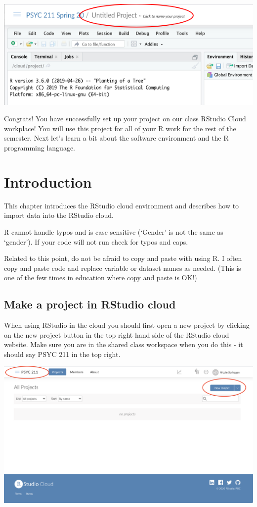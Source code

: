 \documentclass[
]{book}
\begin{document}
\includegraphics{img/Projname.png}

Congrats! You have successfully set up your project on our class RStudio Cloud workplace! You will use this project for all of your R work for the rest of the semester. Next let's learn a bit about the software environment and the R programming language.

\hypertarget{introduction}{%
\chapter{Introduction}\label{introduction}}

This chapter introduces the RStudio cloud environment and describes how to import data into the RStudio cloud.

R cannot handle typos and is case sensitive (`Gender' is not the same as `gender'). If your code will not run check for typos and caps.

Related to this point, do not be afraid to copy and paste with using R. I often copy and paste code and replace variable or dataset names as needed. (This is one of the few times in education where copy and paste is OK!)

\hypertarget{make-a-project-in-rstudio-cloud}{%
\section{Make a project in RStudio cloud}\label{make-a-project-in-rstudio-cloud}}

When using RStudio in the cloud you should first open a new project by clicking on the new project button in the top right hand side of the RStudio cloud website. Make sure you are in the shared class workspace when you do this - it should say PSYC 211 in the top right.

\includegraphics{img/newproj.png}
\end{document}
